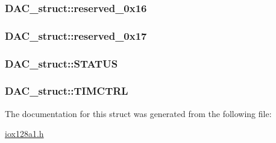 \label{struct_d_a_c__struct_a67857997d8f24d498e3686ae29b79371}
\hypertarget{struct_d_a_c__struct_a0ce926ace5a199310183279eb9798655}{
\subsubsection[{reserved\_\-0x16}]{ {\bf DAC\_\-struct::reserved\_\-0x16}}}
\label{struct_d_a_c__struct_a0ce926ace5a199310183279eb9798655}
\hypertarget{struct_d_a_c__struct_accf051d6143609160f3394908b690702}{
\subsubsection[{reserved\_\-0x17}]{ {\bf DAC\_\-struct::reserved\_\-0x17}}}
\label{struct_d_a_c__struct_accf051d6143609160f3394908b690702}
\hypertarget{struct_d_a_c__struct_ae05c7095bf585d287338f128da447ce9}{
\subsubsection[{STATUS}]{ {\bf DAC\_\-struct::STATUS}}}
\label{struct_d_a_c__struct_ae05c7095bf585d287338f128da447ce9}
\hypertarget{struct_d_a_c__struct_a2ae0426ec63c80911ddd28edca4dafdb}{
\subsubsection[{TIMCTRL}]{ {\bf DAC\_\-struct::TIMCTRL}}}
\label{struct_d_a_c__struct_a2ae0426ec63c80911ddd28edca4dafdb}


The documentation for this struct was generated from the following file:\begin{DoxyCompactItemize}
\item 
\hyperlink{iox128a1_8h}{iox128a1.h}\end{DoxyCompactItemize}
